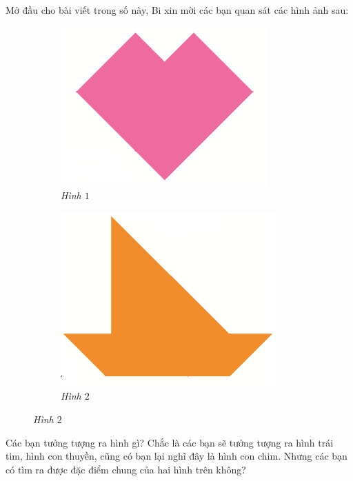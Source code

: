 	Mở đầu cho bài viết trong số này, Bi xin mời các bạn quan sát các hình ảnh sau:
	\begin{figure}[H]
		\vspace*{-5pt}
		\centering
		\captionsetup{labelformat=empty}
		\begin{subfigure}{.45\textwidth}
		\captionsetup{labelformat=empty}
		\centering
		\includegraphics[width=.5\linewidth]{image1}
		\caption{\small \it Hình $1$}
		\end{subfigure}
		\begin{subfigure}{.45\textwidth}
		\captionsetup{labelformat=empty}
		\centering
		\includegraphics[width=.5\linewidth]{image2}
		\caption{\small \it Hình $2$}
	\end{subfigure}
	\vspace*{-10pt}
\end{figure}	
	Các bạn tưởng tượng ra hình gì?
	\vskip 0.1cm
	Chắc là các bạn sẽ tưởng tượng ra hình trái tim, hình con thuyền, cũng có bạn lại nghĩ đây là hình con chim. Nhưng các bạn có tìm ra được đặc điểm chung của hai hình trên không?
